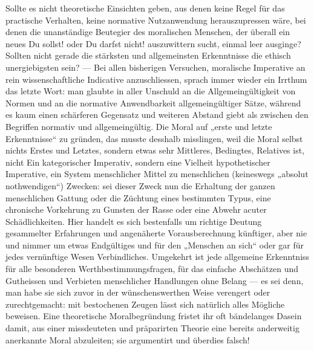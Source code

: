 Sollte es nicht theoretische Einsichten geben, aus denen keine Regel für das practische Verhalten, keine normative Nutzanwendung herauszupressen wäre, bei denen die unanständige Beutegier des moralischen Menschen, der überall ein neues Du sollst! oder Du darfst nicht! auszuwittern sucht, einmal leer ausginge? Sollten nicht gerade die stärksten und allgemeinsten Erkenntnisse die ethisch unergiebigsten sein? — Bei allen bisherigen Versuchen, moralische Imperative an rein wissenschaftliche Indicative anzuschliessen, sprach immer wieder ein Irrthum das letzte Wort: man glaubte in aller Unschuld an die Allgemeingültigkeit von Normen und an die normative Anwendbarkeit allgemeingültiger Sätze, während es kaum einen schärferen Gegensatz und weiteren Abstand giebt als zwischen den Begriffen normativ und allgemeingültig. Die Moral auf „erste und letzte Erkenntnisse“ zu gründen, das musste desshalb misslingen, weil die Moral selbst nichts Erstes und Letztes, sondern etwas sehr Mittleres, Bedingtes, Relatives ist, nicht Ein kategorischer Imperativ, sondern eine Vielheit hypothetischer Imperative, ein System menschlicher Mittel zu menschlichen (keineswegs „absolut nothwendigen“) Zwecken: sei dieser Zweck nun die Erhaltung der ganzen menschlichen Gattung oder die Züchtung eines bestimmten Typus, eine chronische Vorkehrung zu Gunsten der Rasse oder eine Abwehr acuter Schädlichkeiten. Hier handelt es sich bestenfalls um richtige Deutung gesammelter Erfahrungen und angenäherte Vorausberechnung künftiger, aber nie und nimmer um etwas Endgültiges und für den „Menschen an sich“ oder gar für jedes vernünftige Wesen Verbindliches. Umgekehrt ist jede allgemeine Erkenntniss für alle besonderen Werthbestimmungsfragen, für das einfache Abschätzen und Gutheissen und Verbieten menschlicher Handlungen ohne Belang — es sei denn, man habe sie sich zuvor in der wünschenswerthen Weise verengert oder zurechtgemacht: mit bestochenen Zeugen lässt sich natürlich alles Mögliche beweisen. Eine theoretische Moralbegründung fristet ihr oft bändelanges Dasein damit, aus einer missdeuteten und präparirten Theorie eine bereits anderweitig anerkannte Moral abzuleiten; sie argumentirt und überdies falsch!
\par

